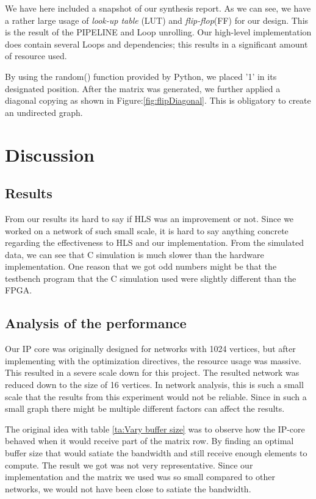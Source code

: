 We have here included a snapshot of our synthesis report. As we can see, we have a rather large usage of \textit{look-up table} (LUT) and \textit{flip-flop}(FF) for our design. This is the result of the PIPELINE and Loop unrolling. Our high-level implementation does contain several Loops and dependencies; this results in a significant amount of resource used. 


By using the random() function provided by Python, we placed '1' in its designated position. After the matrix was generated, we further applied a diagonal copying as shown in Figure:\ref{fig:flipDiagonal}. This is obligatory to create an undirected graph.



\section{Discussion}

\subsection{Results}
From our results its hard to say if HLS was an improvement or not. Since we worked on a network of such small scale, it is hard to say anything concrete regarding the effectiveness to HLS and our implementation. From the simulated data, we can see that C simulation is much slower than the hardware implementation. One reason that we got odd numbers might be that the testbench program that the C simulation used were slightly different than the FPGA.  

\subsection*{Analysis of the performance}
Our IP core was originally designed for networks with 1024 vertices, but after implementing with the optimization directives, the resource usage was massive. This resulted in a severe scale down for this project. The resulted network was reduced down to the size of 16 vertices. In network analysis, this is such a small scale that the results from this experiment would not be reliable. Since in such a small graph there might be multiple different factors can affect the results.  

The original idea with table \ref{ta:Vary buffer size} was to observe how the IP-core behaved when it would receive part of the matrix row. By finding an optimal buffer size that would satiate the bandwidth and still receive enough elements to compute. The result we got was not very representative. Since our implementation and the matrix we used was so small compared to other networks, we would not have been close to satiate the bandwidth.
 

